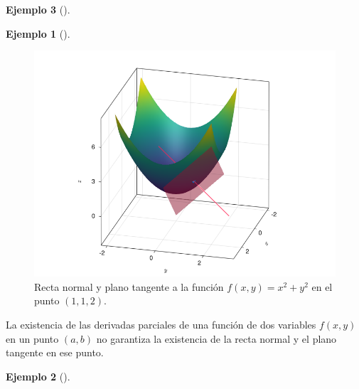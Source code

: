 \documentclass[
  a4paper,
]{scrreport}
\theoremstyle{definition}
\newtheorem{example}{Ejemplo}[chapter]
\theoremstyle{plain}
\theoremstyle{definition}
\theoremstyle{definition}
\theoremstyle{plain}
\theoremstyle{plain}
\theoremstyle{remark}
\begin{document}
\begin{example}[]
\begin{example}[]
\begin{figure}[H]

{\centering \includegraphics{./img/derivadas-funciones-varias-variables/recta-normal-plano-tangente.png}

}

\caption{Recta normal y plano tangente a la función \(f(x,y)=x^2+y^2\)
en el punto \((1,1,2)\).}

\end{figure}%

\end{example}

\begin{tcolorbox}[enhanced jigsaw, leftrule=.75mm, colbacktitle=quarto-callout-warning-color!10!white, toprule=.15mm, opacityback=0, opacitybacktitle=0.6, toptitle=1mm, breakable, bottomtitle=1mm, colframe=quarto-callout-warning-color-frame, rightrule=.15mm, titlerule=0mm, title=\textcolor{quarto-callout-warning-color}{\faExclamationTriangle}\hspace{0.5em}{Advertencia}, arc=.35mm, left=2mm, bottomrule=.15mm, colback=white, coltitle=black]

La existencia de las derivadas parciales de una función de dos variables
\(f(x,y)\) en un punto \((a,b)\) no garantiza la existencia de la recta
normal y el plano tangente en ese punto.

\end{tcolorbox}

\begin{example}[]\protect\hypertarget{exm-funcion-sin-plano-tangente}{}\label{exm-funcion-sin-plano-tangente}


\end{example}
\end{example}
\end{document}

